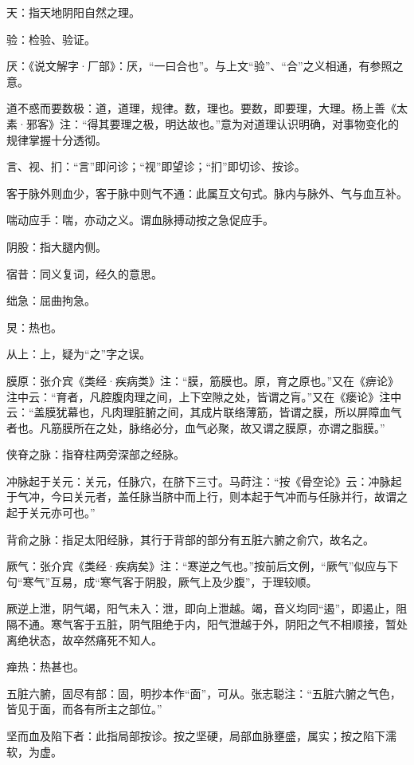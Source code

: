 \documentclass[draft,12pt]{ctexbook}
\begin{document}

\begin{jiaozhu}
  \item 天：指天地阴阳自然之理。
  \item 验：检验、验证。
  \item 厌：《说文解字·厂部》：厌，“一曰合也”。与上文“验”、“合”之义相通，有参照之意。
  \item 道不惑而要数极：道，道理，规律。数，理也。要数，即要理，大理。杨上善《太素·邪客》注：“得其要理之极，明达故也。”意为对道理认识明确，对事物变化的规律掌握十分透彻。
  \item 言、视、扪：“言”即问诊；“视”即望诊；“扪”即切诊、按诊。
  \item 客于脉外则血少，客于脉中则气不通：此属互文句式。脉内与脉外、气与血互补。
  \item 喘动应手：喘，亦动之义。谓血脉搏动按之急促应手。
  \item 阴股：指大腿内侧。
  \item 宿昔：同义复词，经久的意思。
  \item 绌急：屈曲拘急。
  \item 炅：热也。
  \item 从上：上，疑为“之”字之误。
  \item 膜原：张介宾《类经·疾病类》注：“膜，筋膜也。原，育之原也。”又在《痹论》注中云：“育者，凡腔腹肉理之间，上下空隙之处，皆谓之肓。”又在《瘘论》注中云：“盖膜犹幕也，凡肉理脏腑之间，其成片联络薄筋，皆谓之膜，所以屏障血气者也。凡筋膜所在之处，脉络必分，血气必聚，故又谓之膜原，亦谓之脂膜。”
  \item 侠脊之脉：指脊柱两旁深部之经脉。
  \item 冲脉起于关元：关元，任脉穴，在脐下三寸。马莳注：“按《骨空论》云：冲脉起于气冲，今曰关元者，盖任脉当脐中而上行，则本起于气冲而与任脉并行，故谓之起于关元亦可也。”
  \item 背俞之脉：指足太阳经脉，其行于背部的部分有五脏六腑之俞穴，故名之。
  \item 厥气：张介宾《类经·疾病矣》注：“寒逆之气也。”按前后文例，“厥气”似应与下句“寒气”互易，成“寒气客于阴股，厥气上及少腹”，于理较顺。
  \item 厥逆上泄，阴气竭，阳气未入：泄，即向上泄越。竭，音义均同“遏”，即遏止，阻隔不通。寒气客于五脏，阴气阻绝于内，阳气泄越于外，阴阳之气不相顺接，暂处离绝状态，故卒然痛死不知人。
  \item 瘅热：热甚也。
  \item 五脏六腑，固尽有部：固，明抄本作“面”，可从。张志聪注：“五脏六腑之气色，皆见于面，而各有所主之部位。”
  \item 坚而血及陷下者：此指局部按诊。按之坚硬，局部血脉壅盛，属实；按之陷下濡软，为虚。
\end{jiaozhu}
\end{document}
